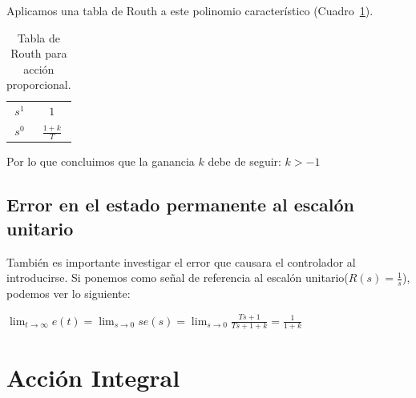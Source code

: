             Aplicamos una tabla de Routh a este polinomio característico (Cuadro~\ref{tab:AccionProporcional}).

            \begin{table}[htbp]
                \centering
                \begin{tabular}{c|c}
                $s^1$ & $1$ \\
                $s^0$ & $\frac{1+k}{T}$
                \end{tabular}
                \caption{\label{tab:AccionProporcional}Tabla de Routh para acción proporcional.}
            \end{table}

Por lo que concluimos que la ganancia $k$ debe de seguir: $k>-1$

        \subsection{Error en el estado permanente al escalón unitario}
            También es importante investigar el error que causara el controlador al introducirse. Si ponemos como señal de referencia al escalón unitario($R(s) = \frac{1}{s}$), podemos ver lo siguiente:

            \begin{math}
                \displaystyle \lim_{t \to \infty} e(t) = \lim_{s \to 0} s e(s) = \lim_{s \to 0} \frac{Ts + 1}{Ts + 1 + k} = \frac{1}{1 + k}
            \end{math}


    \newpage
    \section{Acción Integral}

